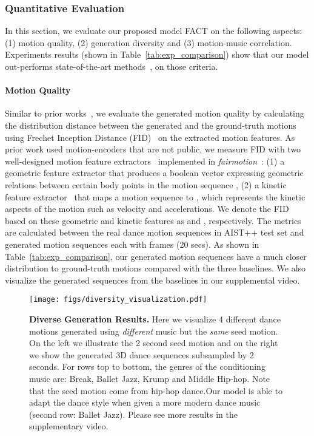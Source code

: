 \subsubsection{Quantitative Evaluation}
In this section, we evaluate our proposed model FACT on the following aspects: (1) motion quality, (2) generation diversity and (3) motion-music correlation. 
Experiments results (shown in Table~\ref{tab:exp_comparison}) show that our model out-performs state-of-the-art methods~\cite{li2020learning, huang2021, zhuang2020music2dance}, on those criteria.


\paragraph{Motion Quality} 
Similar to prior works~\cite{li2020learning, huang2021}, we evaluate the generated motion quality by calculating the distribution distance between the generated and the ground-truth motions using Frechet Inception Distance (FID)~\cite{heusel2017gans} on the extracted motion features. {As prior work used motion-encoders that are not public, we measure FID with two well-designed motion feature extractors~\cite{muller2005efficient, onuma2008fmdistance} implemented in \emph{fairmotion}~\cite{gopinath2020fairmotion}: (1) a geometric feature extractor that produces a boolean vector  expressing geometric relations between certain body points in the motion sequence , (2) a kinetic feature extractor~\cite{onuma2008fmdistance} that maps a motion sequence  to , which represents the kinetic aspects of the motion such as velocity and accelerations. We denote the FID based on these geometric and kinetic features as \FIDm and \FIDk, respectively.
The metrics are calculated between the real dance motion sequences in AIST++ test set and  generated motion sequences each with  frames (20 secs). }
As shown in Table~\ref{tab:exp_comparison}, our generated motion sequences have a much closer distribution to ground-truth motions compared with the three baselines.
We also visualize the generated sequences from the baselines in our supplemental video.
\begin{figure}[t]
\vspace{-8mm}
\centering
\texttt{[image: figs/diversity\_visualization.pdf]}
\vspace{-1mm}
\caption{\textbf{Diverse Generation Results.} Here we visualize 4 different dance motions generated using \textit{different} music but the \textit{same} seed motion. 
On the left we illustrate the 2 second seed motion and on the right we show the generated 3D dance sequences subsampled by 2 seconds.  
For rows top to bottom, the genres of the conditioning music are: Break, Ballet Jazz, Krump and Middle Hip-hop. 
Note that the seed motion come from hip-hop dance.Our model is able to adapt the dance style when given a more modern dance music (second row: Ballet Jazz). Please see more results in the supplementary video. 
} 
\label{fig:diversity_vis}
\vspace{-5mm}
\end{figure} 
\vspace{-3mm}
